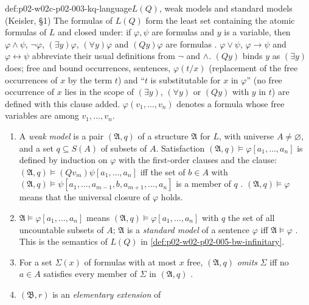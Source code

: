 \begin{hbdefinition}{def:p02-w02c-p02-003-kq-language}{\(L(Q)\), weak models and standard models (Keisler, \S1)}
The formulas of \(L(Q)\) form the least set containing the atomic formulas
of \(L\) and closed under: if \(\varphi,\psi\) are formulas and \(y\) is a
variable, then \(\varphi\land\psi\), \(\neg\varphi\), \((\exists y)\varphi\),
\((\forall y)\varphi\) and \((Qy)\varphi\) are formulas
\cite[\S1, p.~4]{Keisler1970}.  \(\varphi\lor\psi\), \(\varphi\to\psi\) and
\(\varphi\leftrightarrow\psi\) abbreviate their usual definitions from
\(\neg\) and \(\land\).  \((Qy)\) binds \(y\) as \((\exists y)\) does; free
and bound occurrences, sentences, \(\varphi(t/x)\) (replacement of the free
occurrences of \(x\) by the term \(t\)) and ``\(t\) is substitutable for
\(x\) in \(\varphi\)'' (no free occurrence of \(x\) lies in the scope of
\((\exists y)\), \((\forall y)\) or \((Qy)\) with \(y\) in \(t\)) are
defined with this clause added.  \(\varphi(v_1,\ldots,v_n)\) denotes a
formula whose free variables are among \(v_1,\ldots,v_n\).
\begin{enumerate}
\item A \emph{weak model} is a pair \((\mathfrak A,q)\) of a structure
      \(\mathfrak A\) for \(L\), with universe \(A\neq\varnothing\), and a set
      \(q\subseteq S(A)\) of subsets of \(A\).  Satisfaction
      \((\mathfrak A,q)\models\varphi[a_1,\ldots,a_n]\) is defined by
      induction on \(\varphi\) with the first-order clauses and the clause:
      \((\mathfrak A,q)\models(Qv_m)\psi[a_1,\ldots,a_n]\) iff the set of
      \(b\in A\) with \((\mathfrak A,q)\models\psi[a_1,\ldots,a_{m-1},b,
      a_{m+1},\ldots,a_n]\) is a member of \(q\)
      \cite[\S1, pp.~4--5]{Keisler1970}.  \((\mathfrak A,q)\models\varphi\)
      means that the universal closure of \(\varphi\) holds.
\item \(\mathfrak A\models\varphi[a_1,\ldots,a_n]\) means
      \((\mathfrak A,q)\models\varphi[a_1,\ldots,a_n]\) with \(q\) the set of
      all uncountable subsets of \(A\); \(\mathfrak A\) is a \emph{standard
      model} of a sentence \(\varphi\) iff \(\mathfrak A\models\varphi\)
      \cite[\S1, p.~5]{Keisler1970}.  This is the semantics of \(L(Q)\) in
      \cref{def:p02-w02-p02-005-bw-infinitary}.
\item For a set \(\Sigma(x)\) of formulas with at most \(x\) free,
      \((\mathfrak A,q)\) \emph{omits} \(\Sigma\) iff no \(a\in A\) satisfies
      every member of \(\Sigma\) in \((\mathfrak A,q)\)
      \cite[\S1, p.~5]{Keisler1970}.
\item \((\mathfrak B,r)\) is an \emph{elementary extension} of

\end{enumerate}
\end{hbdefinition}
